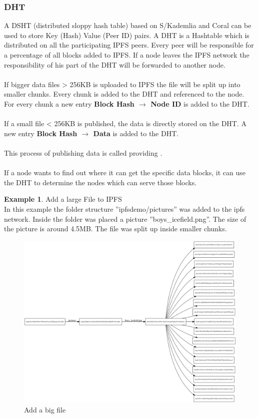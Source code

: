 \documentclass[a4paper,11pt, oneside]{report}
\theoremstyle{definition}
\newtheorem{exmp}{Example}[subsection]
\begin{document}
\subsubsection{DHT}
A DSHT (distributed sloppy hash table) based on S/Kademlia and Coral can be used to store Key (Hash) Value (Peer ID) pairs. A DHT is a Hashtable which is distributed on all the participating IPFS peers. Every peer will be responsible for a percentage of all blocks added to IPFS. If a node leaves the IPFS network the responsibility of his part of the DHT will be forwarded to another node. \\ \\
If bigger data files > 256KB is uploaded to IPFS the file will be split up into smaller chunks. Every chunk  is added to the DHT and referenced to the node. For every chunk a new entry \textbf{Block Hash $\rightarrow$ Node ID} is added to the DHT.\\ \\
If a small file < 256KB is published, the data is directly stored on the DHT. A new entry \textbf{Block Hash $\rightarrow$ Data} is added to the DHT.\\ \\
This process of publishing data is called providing \cite{dht-provide}.\\ \\ 
If a node wants to find out where it can get the specific data blocks, it can use the DHT to determine the nodes which can serve those blocks.

\newpage
\begin{exmp}Add a large File to IPFS \\
In this example the folder structure ''ipfsdemo/pictures'' was added to the ipfs network. Inside the folder was placed a picture ''boys\_icefield.png''. The size of the picture is around 4.5MB. The file was split up inside smaller chunks.
\begin{figure}[H]
\centering
\includegraphics[width=\textwidth]{img/ipfs-object-example.png}
\caption[Add big data]{Add a big file}
\end{figure}
\end{exmp}
\end{document}
